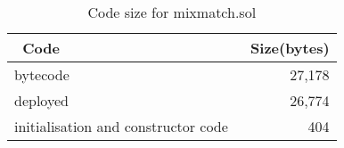 
\begin{table}[t]
	\centering
	\begin{tabular}{|l|r|}
		\hline
		~\textbf{Code}	& ~\textbf{Size(bytes)}  \\ \hline
		bytecode	& 27,178  \\ \hline
		deployed	& 26,774  \\ \hline
		initialisation and constructor code 	& 404 \\ \hline
	\end{tabular}
	\caption{Code size for mixmatch.sol}
	\label{tab:codesize}
\end{table}